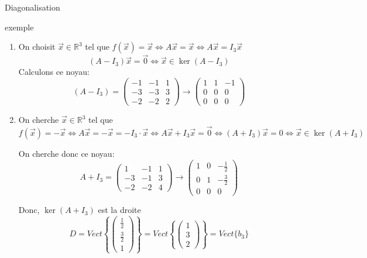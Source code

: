 \begin{parag}{Diagonalisation}
\begin{subparag}{exemple}
    \begin{enumerate}
        \item On choisit $\vec{x} \in \mathbb{R}^3$ tel que $f(\vec{x}) = \vec{x} \Leftrightarrow A\vec{x} = \vec{x} \Leftrightarrow A\vec{x} = I_3 \vec{x}$
        \\
        \[(A - I_3)\vec{x} = \vec{0} \Leftrightarrow \vec{x} \in \ker (A - I_3)\]
        Calculons ce noyau:
        \[(A - I_3) = \begin{pmatrix}
            -1 & -1 & 1 \\
            -3  & -3 & 3 \\
            -2  & -2 & 2
        \end{pmatrix} \to \begin{pmatrix}
            1 & 1 & -1 \\
            0 & 0 & 0 \\
            0 & 0 & 0 
        \end{pmatrix}\]
    \item On cherche $\vec{x} \in \mathbb{R}^3$ tel que $f(\vec{x}) = -\vec{x} \Leftrightarrow A\vec{x} = -\vec{x} = -I_3\cdot\vec{x} \Leftrightarrow A\vec{x} + I_3\vec{x} = \vec{0} \Leftrightarrow (A + I_3)\vec{x} = 0 \Leftrightarrow \vec{x} \in \ker (A + I_3)$

    On cherche donc ce noyau:
\[A + I_3 = \begin{pmatrix}
    1 & -1 & 1\\
    -3 & -1 & 3\\
    -2 & -2 & 4
\end{pmatrix} \to \begin{pmatrix}
    1 & 0 & -\frac{1}{2}\\
    0 & 1 & -\frac{3}{2}\\
    0 & 0 & 0
\end{pmatrix}\]

Donc, $\ker(A + I_3)$ est la droite \\
\[D = Vect\left\{ \begin{pmatrix}
    \frac{1}{2}\\ \frac{3}{2} \\ 1
\end{pmatrix}\right\} =  Vect \left\{\begin{pmatrix}
    1 \\ 3 \\ 2
\end{pmatrix}\right\} = Vect \{b_3\}\]


\end{enumerate}
\end{subparag}
\end{parag}
